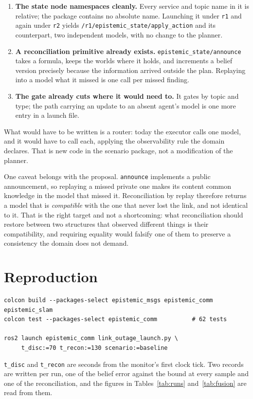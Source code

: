 \documentclass[11pt,a4paper]{article}
\theoremstyle{definition}
\newcommand{\code}[1]{\texttt{\small #1}}
\begin{document}
\begin{enumerate}[itemsep=4pt, topsep=4pt]
  \item \textbf{The state node namespaces cleanly.} Every service and topic
        name in it is relative; the package contains no absolute name. Launching
        it under \code{r1} and again under \code{r2} yields
        \code{/r1/epistemic\_state/apply\_action} and its counterpart, two
        independent models, with no change to the planner.
  \item \textbf{A reconciliation primitive already exists.}
        \code{epistemic\_state/announce} takes a formula, keeps the worlds where
        it holds, and increments a belief version precisely because the
        information arrived outside the plan. Replaying into a model what it
        missed is one call per missed finding.
  \item \textbf{The gate already cuts where it would need to.} It gates by
        topic and type; the path carrying an update to an absent agent's model
        is one more entry in a launch file.
\end{enumerate}

What would have to be written is a router: today the executor calls one model,
and it would have to call each, applying the observability rule the domain
declares. That is new code in the scenario package, not a modification of the
planner.

One caveat belongs with the proposal. \code{announce} implements a public
announcement, so replaying a missed private one makes its content common
knowledge in the model that missed it. Reconciliation by replay therefore
returns a model that is \emph{compatible} with the one that never lost the
link, and not identical to it. That is the right target and not a
shortcoming: what reconciliation should restore between two structures that
observed different things is their compatibility, and requiring equality would
falsify one of them to preserve a consistency the domain does not demand.

\section*{Reproduction}

\begin{lstlisting}
colcon build --packages-select epistemic_msgs epistemic_comm epistemic_slam
colcon test --packages-select epistemic_comm          # 62 tests

ros2 launch epistemic_comm link_outage_launch.py \
     t_disc:=70 t_recon:=130 scenario:=baseline
\end{lstlisting}

\noindent
\code{t\_disc} and \code{t\_recon} are seconds from the monitor's first clock
tick. Two records are written per run, one of the belief error against the
bound at every sample and one of the reconciliation, and the figures in
Tables~\ref{tab:runs} and~\ref{tab:fusion} are read from them.
\end{document}
